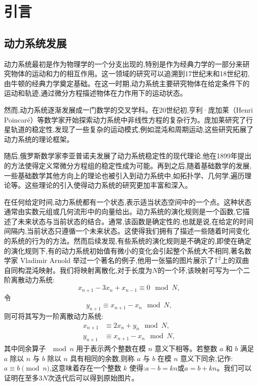\chapter{引言}\label{chap:introduction}
\section{动力系统发展}
动力系统最初是作为物理学的一个分支出现的,特别是作为经典力学的一部分来研究物体的运动和力的相互作用。这一领域的研究可以追溯到17世纪末和18世纪初,由牛顿的经典力学奠定基础。在这一时期,动力系统主要研究物体在给定条件下的运动和轨迹,通过微分方程描述物体在力作用下的运动状态。

然而,动力系统逐渐发展成一门数学的交叉学科。在20世纪初,亨利·庞加莱（Henri Poincaré）等数学家开始探索动力系统中非线性方程的复杂行为。庞加莱研究了行星轨道的稳定性,发现了一些复杂的运动模式,例如混沌和周期运动,这些研究拓展了动力系统的理论框架。

随后,俄罗斯数学家李亚普诺夫发展了动力系统稳定性的现代理论,他在1899年提出的方法使得定义常微分方程组的稳定性成为可能。再到之后,随着基础数学的发展,一些基础数学其他方向上的理论也被引入到动力系统中,如拓扑学、几何学,遍历理论等。这些理论的引入使得动力系统的研究更加丰富和深入。

在任何给定时间,动力系统都有一个状态,表示适当状态空间中的一个点。这种状态通常由实数元组或几何流形中的向量给出。动力系统的演化规则是一个函数,它描述了未来状态与当前状态的结合。通常,该函数是确定性的,也就是说,在给定的时间间隔内,当前状态只遵循一个未来状态\cite{strogatz2018nonlinear}。这使得我们拥有了描述一些随着时间变化的系统的行为的方法。然而后续发现,有些系统的演化规则是不确定的,即使在确定的演化规则下,有的动力系统初始值有微小的变化会引起整个系统大不相同,著名数学家 Vladimir Arnold 举过一个著名的例子,他用一张猫的图片展示了$\mathbb{T}^2$上的双曲自同构混沌映射。我们将映射离散化,对于长度为$N$的一个环,该映射可写为一个二阶离散动力系统:
\begin{equation}
    x_{n+1}-3x_n+x_{n-1}\equiv 0 \mod N,
\end{equation}
令\begin{equation}
    y_{n+1}\equiv x_{n+1}-x_n \mod N,
\end{equation}
则可将其写为一阶离散动力系统:
\begin{equation}
    \begin{aligned}
        x_{n+1}&\equiv 2x_n+y_n \mod N,\\
        y_{n+1}&\equiv x_{n+1}-x_n \mod N,
    \end{aligned}
\end{equation}
其中同余算子 \( \mod n \) 用于表示两个整数在模 \( n \) 意义下相等。若整数 \( a \) 和 \( b \) 满足 \( a \) 除以 \( n \) 与 \( b \) 除以 \( n \) 具有相同的余数,则称 \( a \) 与 \( b \) 在模 \( n \) 意义下同余,记作:$a \equiv b \pmod{n}$,这意味着存在一个整数 \( k \) 使得:$a - b = kn$或$a = b + kn$。我们可以证明在至多$3N$次迭代后可以得到原始图片\cite{enwiki:1223508209}。

